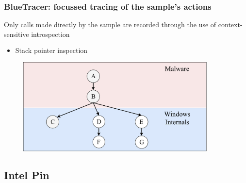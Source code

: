 \documentclass[compress]{beamer}
\begin{document}
\begin{frame}
    \frametitle{BlueTracer: focussed tracing of the sample's actions}

Only calls made directly by the sample are recorded through the use of context-sensitive introspection
\begin{itemize}
\item Stack pointer inspection
\end{itemize}    
\medskip
	    \begin{figure}
    	\vspace{-0.3cm}
        \includegraphics[width=10cm]{image/MainImageTree.pdf}
    \end{figure}

\end{frame}

\iffalse
\subsection{Intel Pin}
\end{document}
